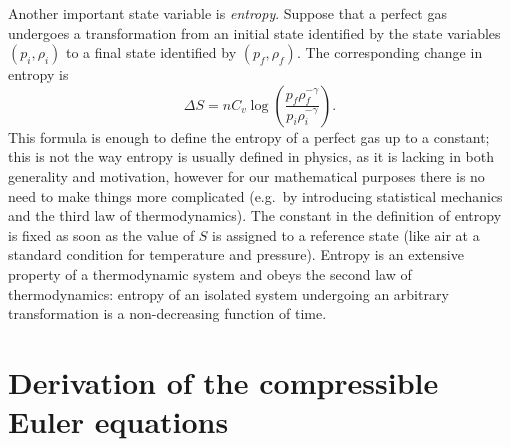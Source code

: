 Another important state variable is \emph{entropy}. Suppose that a perfect
gas undergoes a transformation from an initial state identified by the
state variables $(p_i,\rho_i)$ to a final state identified by $(p_f,\rho_f)$.
The corresponding change in entropy is
\[
\Delta S = n C_v \log\left( \frac{p_f \rho_f^{-\gamma}}{p_i \rho_i^{-\gamma}} \right).
\]
This formula is enough to define the entropy of a perfect gas up to a constant;
this is not the way entropy is usually defined in physics, as it is lacking
in both generality and motivation, however for our mathematical purposes
there is no need to make things more complicated (e.g.\ by
introducing statistical mechanics and the third law of thermodynamics).
The constant in the definition of entropy is fixed as soon as the value
of $S$ is assigned to a reference state (like air at a
standard condition for temperature and pressure).
Entropy is an extensive property of a thermodynamic system and
obeys the second law of thermodynamics: entropy of an isolated system
undergoing an arbitrary transformation is a non-decreasing function of time.

\section{Derivation of the compressible Euler equations}

